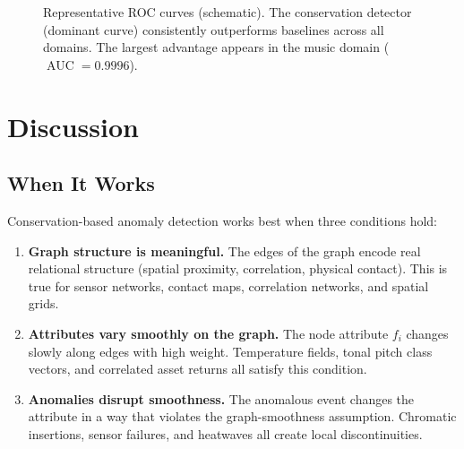 \documentclass[11pt,a4paper]{article}
\DeclareMathOperator{\AUC}{AUC}
\begin{document}
\begin{figure}[ht]
\centering
{}
\caption{Representative ROC curves (schematic).  The conservation detector
(dominant curve) consistently outperforms baselines across all domains.  The
largest advantage appears in the music domain ($\AUC = 0.9996$).}
\label{fig:roc}
\end{figure}

\section{Discussion}\label{sec:discussion}

\subsection{When It Works}

Conservation-based anomaly detection works best when three conditions hold:

\begin{enumerate}
  \item \textbf{Graph structure is meaningful.} The edges of the graph encode
        real relational structure (spatial proximity, correlation, physical
        contact).  This is true for sensor networks, contact maps, correlation
        networks, and spatial grids.
  \item \textbf{Attributes vary smoothly on the graph.} The node attribute
        $f_i$ changes slowly along edges with high weight.  Temperature fields,
        tonal pitch class vectors, and correlated asset returns all satisfy
        this condition.
  \item \textbf{Anomalies disrupt smoothness.} The anomalous event changes the
        attribute in a way that violates the graph-smoothness assumption.
        Chromatic insertions, sensor failures, and heatwaves all create local
        discontinuities.
\end{enumerate}
\end{document}
